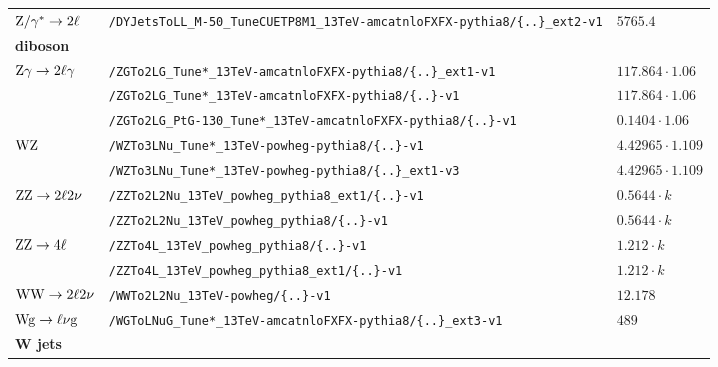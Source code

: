 \begin{table}[tb]
\begin{tabular}[width=\textwidth]{lll}
  $\mathrm{Z}/\gamma^{*}\to2\ell$                           & \verb|/DYJetsToLL_M-50_TuneCUETP8M1_13TeV-amcatnloFXFX-pythia8/{..}_ext2-v1|  & $5765.4$                                  \\
  \scriptsize{\textbf{diboson}}                    &                         &                                           \\
  $\mathrm{Z}\gamma\to2\ell\gamma$                            & \verb|/ZGTo2LG_Tune*_13TeV-amcatnloFXFX-pythia8/{..}_ext1-v1|  & $117.864\cdot1.06$                        \\
                                                   & \verb|/ZGTo2LG_Tune*_13TeV-amcatnloFXFX-pythia8/{..}-v1|  & $117.864\cdot1.06$                        \\
                                                   & \verb|/ZGTo2LG_PtG-130_Tune*_13TeV-amcatnloFXFX-pythia8/{..}-v1|  & $0.1404\cdot1.06$                         \\
  $\mathrm{W}\mathrm{Z}$                                         & \verb|/WZTo3LNu_Tune*_13TeV-powheg-pythia8/{..}-v1| & $4.42965\cdot1.109$                       \\
                                                   & \verb|/WZTo3LNu_Tune*_13TeV-powheg-pythia8/{..}_ext1-v3| & $4.42965\cdot1.109$                       \\
  $\mathrm{Z}\mathrm{Z}\to2\ell2\nu$                            & \verb|/ZZTo2L2Nu_13TeV_powheg_pythia8_ext1/{..}-v1| & $0.5644\cdot k$                           \\
                                                   & \verb|/ZZTo2L2Nu_13TeV_powheg_pythia8/{..}-v1| & $0.5644\cdot k$                           \\
  $\mathrm{Z}\mathrm{Z}\to4\ell$                                 & \verb|/ZZTo4L_13TeV_powheg_pythia8/{..}-v1| & $1.212\cdot k$                            \\
                                                   & \verb|/ZZTo4L_13TeV_powheg_pythia8_ext1/{..}-v1| & $1.212\cdot k$                            \\
  $\mathrm{W}\mathrm{W}\to2\ell2\nu$                            & \verb|/WWTo2L2Nu_13TeV-powheg/{..}-v1| & $12.178$                                  \\
  $\mathrm{W}\mathrm{g}\to\ell\nu\mathrm{g}$                           & \verb|/WGToLNuG_Tune*_13TeV-amcatnloFXFX-pythia8/{..}_ext3-v1| & $489$                                     \\
  \textbf{W jets}                                  &                         &                                           \\

\end{tabular}
\end{table}
